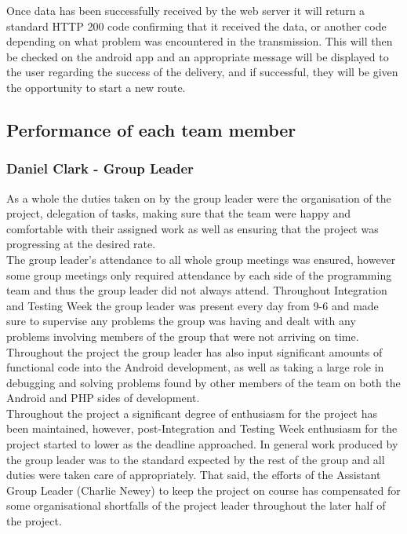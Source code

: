 \documentclass{article}
\begin{document}
		Once data has been successfully received by the web server it will return a standard HTTP 200 code confirming that it received the data, or another code depending on what problem was encountered in the transmission. This will then be checked on the android app and an appropriate message will be displayed to the user regarding the success of the delivery, and if successful, they will be given the opportunity to start a new route.

	\clearpage
		\subsection{Performance of each team member}
		\subsubsection{Daniel Clark - Group Leader}
		As a whole the duties taken on by the group leader were the organisation of the project, delegation of tasks, making sure that the team were happy and comfortable with their assigned work as well as ensuring that the project was progressing at the desired rate. \\
		
		The group leader's attendance to all whole group meetings was ensured, however some group meetings only required attendance by each side of the programming team and thus the group leader did not always attend. Throughout Integration and Testing Week the group leader was present every day from 9-6 and made sure to supervise any problems the group was having and dealt with any problems involving members of the group that were not arriving on time. Throughout the project the group leader has also input significant amounts of functional code into the Android development, as well as taking a large role in debugging and solving problems found by other members of the team on both the Android and PHP sides of development. \\
		
		Throughout the project a significant degree of enthusiasm for the project has been maintained, however, post-Integration and Testing Week enthusiasm for the project started to lower as the deadline approached. In general work produced by the group leader was to the standard expected by the rest of the group and all duties were taken care of appropriately. That said, the efforts of the Assistant Group Leader (Charlie Newey) to keep the project on course has compensated for some organisational shortfalls of the project leader throughout the later half of the project. \\
		
\end{document}
